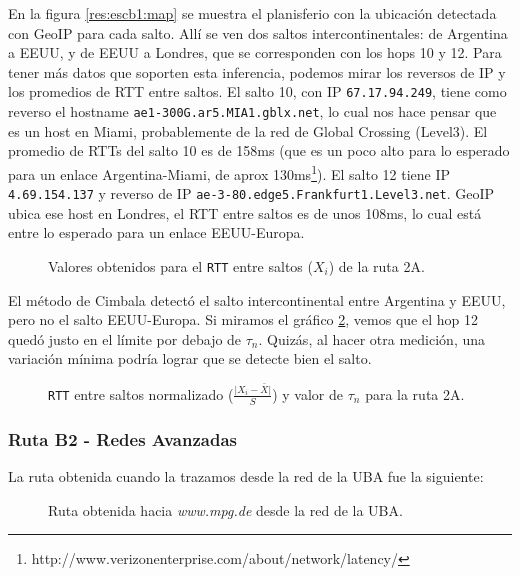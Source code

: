 En la figura \ref{res:escb1:map} se muestra el planisferio con la ubicación detectada con GeoIP para cada salto. Allí se ven dos saltos intercontinentales: de Argentina a EEUU, y de EEUU a Londres, que se corresponden con los hops 10 y 12. Para tener más datos que soporten esta inferencia, podemos mirar los reversos de IP y los promedios de RTT entre saltos. El salto 10, con IP \texttt{67.17.94.249}, tiene como reverso el hostname \texttt{ae1-300G.ar5.MIA1.gblx.net}, lo cual nos hace pensar que es un host en Miami, probablemente de la red de Global Crossing (Level3). El promedio de RTTs del salto 10 es de 158ms (que es un poco alto para lo esperado para un enlace Argentina-Miami, de aprox 130ms\footnote{http://www.verizonenterprise.com/about/network/latency/}). El salto 12 tiene IP \texttt{4.69.154.137} y reverso de IP \texttt{ae-3-80.edge5.Frankfurt1.Level3.net}. GeoIP ubica ese host en Londres, el RTT entre saltos es de unos 108ms, lo cual está entre lo esperado para un enlace EEUU-Europa.

\begin{figure}[H]
    \caption{Valores obtenidos para el \texttt{RTT} entre saltos ($X_i$) de la ruta 2A.}
    \label{res:escb1:rtt}
\end{figure}

El método de Cimbala detectó el salto intercontinental entre Argentina y EEUU, pero no el salto EEUU-Europa. Si miramos el gráfico \ref{res:escb1:rttnorm}, vemos que el hop 12 quedó justo en el límite por debajo de $\tau_n$. Quizás, al hacer otra medición, una variación mínima podría lograr que se detecte bien el salto.

\begin{figure}[H]
    \caption{\texttt{RTT} entre saltos normalizado ($\frac{\vert X_i-\bar{X}\vert}{S}$)
    y valor de $\tau_n$ para la ruta 2A.}
    \label{res:escb1:rttnorm}
\end{figure}

\subsubsection{Ruta B2 - Redes Avanzadas}

La ruta obtenida cuando la trazamos desde la red de la UBA fue la siguiente:

\begin{figure}[H]
    \caption{Ruta obtenida hacia \emph{www.mpg.de} desde la red de la UBA.}
    \label{res:escB1:table}
\end{figure}

